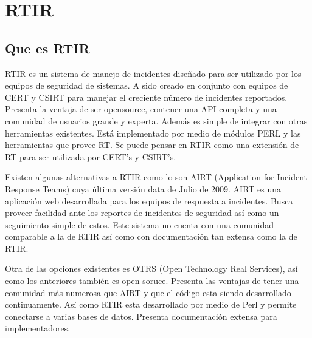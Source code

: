 \chapter{RTIR} %

\label{Chapter1} %

\lhead{\til}
\rhead{\fu}



\section{Que es RTIR}
RTIR es un sistema de manejo de incidentes diseñado para ser utilizado por los 
equipos de seguridad de sistemas. A sido creado en conjunto con equipos de CERT 
y CSIRT para manejar el creciente número de incidentes reportados.
Presenta la ventaja de ser opensource, contener una API completa y una comunidad 
de usuarios grande y experta. Además es simple de integrar con otras 
herramientas existentes. Está implementado por medio de módulos PERL y las 
herramientas que provee RT. Se puede pensar en RTIR como una extensión de RT 
para ser utilizada por CERT's y CSIRT's.

Existen algunas alternativas a RTIR como lo son AIRT (Application for Incident Response Teams) 
cuya última versión data de Julio de 2009. AIRT es una aplicación web 
desarrollada para los equipos de respuesta a incidentes. Busca proveer facilidad 
ante los reportes de incidentes de seguridad así como un seguimiento simple de 
estos. Este sistema no cuenta con una comunidad comparable a la de RTIR así como 
con documentación tan extensa como la de RTIR.

Otra de las opciones existentes es OTRS (Open Technology Real Services), así 
como los anteriores también es open soruce. Presenta las ventajas de tener una 
comunidad más numerosa que AIRT y que el código esta siendo desarrollado continuamente. 
Así como RTIR esta desarrollado por medio de Perl y permite conectarse a varias 
bases de datos. Presenta documentación extensa para implementadores.